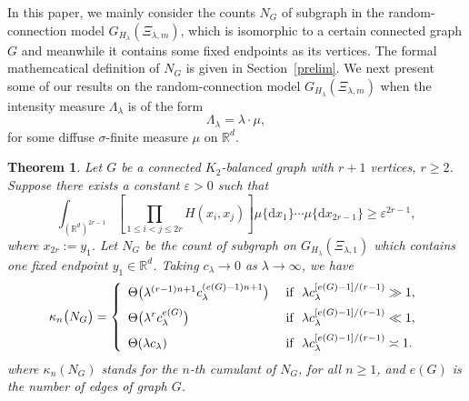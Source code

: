 \documentclass[12pt]{article}
\newcommand{\R}{\mathbb{R}}
\newtheorem{thm}[prop]{Theorem}
\numberwithin{equation}{section}
\begin{document}
In this paper, we mainly consider the counts $N_G$ of subgraph in the random-connection model $G_{H_\lambda}(\Xi_{\lambda,m})$, which is isomorphic to a certain connected graph $G$ and meanwhile it contains some fixed endpoints as its vertices. The formal mathemcatical definition of $N_G$ is given in Section~\ref{prelim}. We next present some of our results on the random-connection model $G_{H_\lambda}(\Xi_{\lambda,m})$ when the intensity measure $\Lambda_\lambda$ is of the form $$\Lambda_\lambda=\lambda\cdot\mu,$$
for some diffuse $\sigma$-finite measure $\mu$ on $\R^d$. 


\begin{thm}\label{thm-1}
  Let $G$ be a connected $K_2$-balanced graph with $r+1$ vertices, $r\ge2$. Suppose there exists a constant $\varepsilon>0$ such that 
  \begin{equation}
    \int_{(\R^d)^{2r-1}}\left[\prod_{1\le i<j\le 2r}H(x_i,x_j)\right]\mu\{\mathrm{d}x_1\}\cdots\mu\{\mathrm{d}x_{2r-1}\}\ge \varepsilon^{2r-1},
  \end{equation}
  where $x_{2r}:=y_1$. Let $N_G$ be the count of subgraph on $G_{H_\lambda}(\Xi_{\lambda,1})$ which contains one fixed endpoint $y_1\in\R^d$. Taking $c_\lambda\to0$ as $\lambda\to\infty$, we have
  \begin{eqnarray}
    \kappa_n\big(N_G\big)=\left\{\begin{array}{ll}
      \Theta\big(\lambda^{(r-1)n+1} c_\lambda^{(e(G)-1)n+1}\big) & \ \mbox{if }\ \lambda c_\lambda^{[e(G)-1]/(r-1)}\gg1,
      \medskip
      \\
      \displaystyle
\Theta\big(\lambda^{r}c_\lambda^{e(G)}\big) & \ \mbox{if }\ \lambda c_\lambda^{[e(G)-1]/(r-1)}\ll1,
    \medskip
    \\
    \displaystyle
    \Theta(\lambda c_\lambda) & \ \mbox{if }\ \lambda c_\lambda^{[e(G)-1]/(r-1)}\asymp1.
    \end{array}
    \right.
  \end{eqnarray}
  where $\kappa_n(N_G)$ stands for the $n$-th cumulant of $N_G$, for all $n\ge 1$, and $e(G)$ is the number of edges of graph $G$.
\end{thm}
\end{document}
